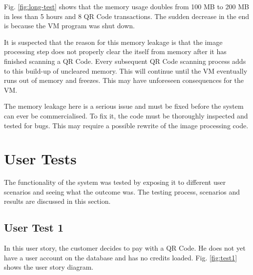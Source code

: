 Fig. \ref{fig:long-test} shows that the memory usage doubles from 100 MB to 200
MB in less than 5 hours and 8 QR Code transactions. The sudden decrease in the
end is because the VM program was shut down. 

It is suspected that the reason for this memory leakage is that the image
processing step does not properly clear the itself from memory after it has
finished scanning a QR Code. Every subsequent QR Code scanning process adds to
this build-up of uncleared memory. This will continue until the VM eventually
runs out of memory and freezes. This may have unforeseen consequences for the
VM.

The memory leakage here is a serious issue and must be fixed before the system can ever be
commercialised. To fix it, the code must be thoroughly inspected and tested for bugs.
This may require a possible rewrite of the image processing code. 

\section{User Tests}

The functionality of the system was tested by exposing it to different user
scenarios and seeing what the outcome was. The testing process, scenarios and
results are discussed in this section.

\subsection{User Test 1}

In this user story, the customer decides to pay with a QR Code.
He does not yet have a user account on the database and has no credits loaded.
Fig. \ref{fig:test1} shows the user story diagram. 

